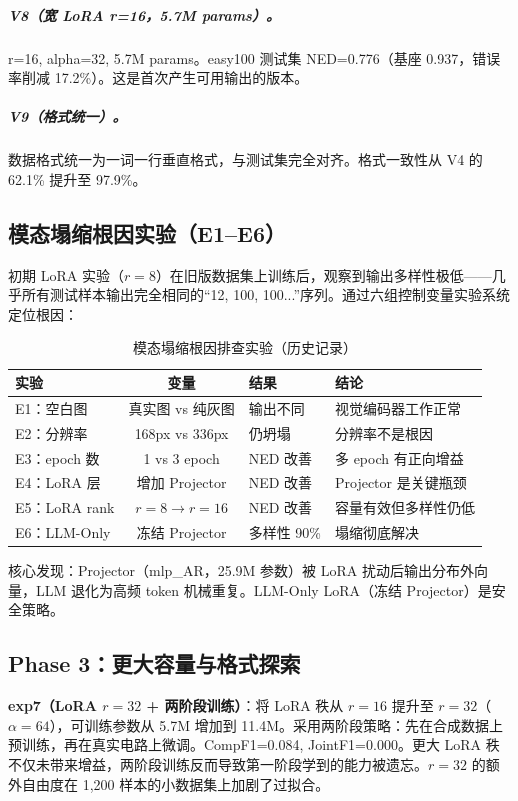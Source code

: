 \subparagraph{V8（宽 LoRA r=16，5.7M params）。}
r=16, alpha=32, 5.7M params。easy100 测试集 NED=0.776（基座 0.937，错误率削减 17.2\%）。这是首次产生可用输出的版本。

\subparagraph{V9（格式统一）。}
数据格式统一为一词一行垂直格式，与测试集完全对齐。格式一致性从 V4 的 62.1\% 提升至 97.9\%。

\subsection{模态塌缩根因实验（E1--E6）}

初期 LoRA 实验（$r=8$）在旧版数据集上训练后，观察到输出多样性极低——几乎所有测试样本输出完全相同的``12, 100, 100...''序列。通过六组控制变量实验系统定位根因：

\begin{table}[h]
\centering
\caption{模态塌缩根因排查实验（历史记录）}
\begin{tabular}{lcp{2.5cm}p{3.5cm}}
\toprule
\textbf{实验} & \textbf{变量} & \textbf{结果} & \textbf{结论} \\
\midrule
E1：空白图    & 真实图 vs 纯灰图 & 输出不同   & 视觉编码器工作正常 \\
E2：分辨率    & 168px vs 336px & 仍坍塌     & 分辨率不是根因 \\
E3：epoch 数  & 1 vs 3 epoch   & NED 改善   & 多 epoch 有正向增益 \\
E4：LoRA 层   & 增加 Projector & NED 改善   & Projector 是关键瓶颈 \\
E5：LoRA rank & $r=8 \to r=16$ & NED 改善   & 容量有效但多样性仍低 \\
E6：LLM-Only  & 冻结 Projector & 多样性 90\% & 塌缩彻底解决 \\
\bottomrule
\end{tabular}
\end{table}

核心发现：Projector（mlp\_AR，25.9M 参数）被 LoRA 扰动后输出分布外向量，LLM 退化为高频 token 机械重复。LLM-Only LoRA（冻结 Projector）是安全策略。


\subsection{Phase 3：更大容量与格式探索}

\textbf{exp7（LoRA $r=32$ + 两阶段训练）}：将 LoRA 秩从 $r=16$ 提升至 $r=32$（$\alpha=64$），可训练参数从 5.7M 增加到 11.4M。采用两阶段策略：先在合成数据上预训练，再在真实电路上微调。CompF1=0.084, JointF1=0.000。更大 LoRA 秩不仅未带来增益，两阶段训练反而导致第一阶段学到的能力被遗忘。$r=32$ 的额外自由度在 1,200 样本的小数据集上加剧了过拟合。

